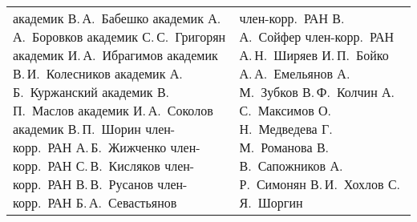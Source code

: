 \documentclass[10pt]{book}
\begin{document}
{\tabcolsep=15pt
\begin{tabular}{p{60mm}p{60mm}}
академик В.\,А.~Бабешко\newline
академик А.\,А.~Боровков\newline 
академик С.\,С.~Григорян\newline 
академик И.\,А.~Ибрагимов\newline 
академик В.\,И.~Колесников\newline 
академик А.\,Б.~Куржанский\newline 
академик В.\,П.~Маслов\newline
академик И.\,А.~Соколов\newline
академик В.\,П.~Шорин\newline 
член-корр.\ РАН А.\,Б.~Жижченко\newline
член-корр.\ РАН С.\,В.~Кисляков\newline 
член-корр.\ РАН В.\,В.~Русанов\newline 
член-корр.\ РАН Б.\,А.~Севастьянов 
&
член-корр.\ РАН В.\,А.~Сойфер\newline
член-корр.\ РАН А.\,Н.~Ширяев\newline
И.\,П.~Бойко\newline 
А.\,А.~Емельянов\newline
А.\,М.~Зубков\newline 
В.\,Ф.~Колчин\newline
 А.\,С.~Максимов\newline
О.\,Н.~Медведева\newline 
Г.\,М.~Романова\newline 
В.\,В.~Сапожников\newline 
А.\,Р.~Симонян\newline 
В.\,И.~Хохлов\newline
С.\,Я.~Шоргин
\end{tabular}


}
\end{document}
